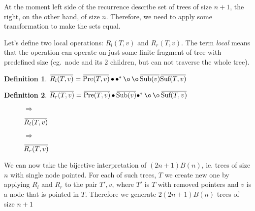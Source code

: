 \documentclass[final]{article}
\theoremstyle{definition}
\newtheorem{definition}{Definition}[subsection]
\theoremstyle{remark}
\newcommand{\ols}[1]{\mskip.5\thinmuskip\overline{\mskip-.5\thinmuskip {#1} \mskip-.5\thinmuskip}\mskip.5\thinmuskip} %
\newcommand{\enc}[1]{\ensuremath{\ols{#1}}}
\newcommand{\pointed}[1]{\ensuremath{{#1}^*}}
\DeclareMathOperator{\tSub}{\text{Sub}}
\DeclareMathOperator{\tPre}{\text{Pre}}
\DeclareMathOperator{\tSuf}{\text{Suf}}
\DeclareMathOperator{\n}{\bullet}
\DeclareMathOperator{\no}{\o}
\begin{document}
At the moment left side of the recurrence describe set of trees of size \(n + 1\), the right, on the other hand, of size \(n\). Therefore, we need to apply some transformation to make the sets equal.

Let's define two local operations: \(R_l(T, v)\) and \(R_r(T, v)\). The term \textit{local} means that the operation can operate on just some finite fragment of tree with predefined size (eg.\ node and its 2 children, but can not traverse the whole tree).

\begin{definition}
    \(\enc{R_l(T, v)} = \enc{\tPre(T, v)} \n \pointed{\n} \no \no \enc{\tSub(v)} \enc{\tSuf(T, v)}\)
\end{definition}

\begin{definition}
    \(\enc{R_r(T, v)} = \enc{\tPre(T, v)} \n \enc{\tSub(v)} \pointed{\n} \no \no \enc{\tSuf(T, v)} \)
\end{definition}

\begin{figure}[h]
    \centering
    \begin{minipage}{.25\textwidth}\end{minipage}%
    \(\Rightarrow\)
    \begin{minipage}{.4\textwidth}\end{minipage}%
    \caption{\(\enc{R_l(T, v)}\)}
    \label{fig:remy_left}
\end{figure}

\begin{figure}[h]
    \centering
    \begin{minipage}{.25\textwidth}\end{minipage}%
    \(\Rightarrow\)
    \begin{minipage}{.4\textwidth}\end{minipage}%
    \caption{\(\enc{R_r(T, v)}\)}
    \label{fig:remy_right}
\end{figure}

We can now take the bijective interpretation of \((2n + 1) B(n)\), ie. trees of size \(n\) with single node pointed. For each of such trees, \(T\) we create new one by applying \(R_l\) and \(R_r\) to the pair \(T', v\), where \(T'\) is \(T\) with removed pointers and \(v\) is a node that is pointed in \(T\). Therefore we generate \(2(2n + 1) B(n)\) trees of size \(n + 1\)
\end{document}
